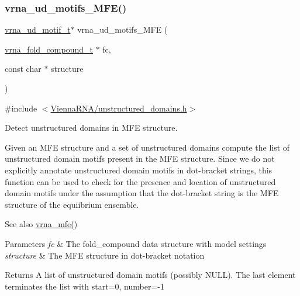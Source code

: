 \subsubsection{\texorpdfstring{vrna\_ud\_motifs\_MFE()}{vrna\_ud\_motifs\_MFE()}}
{\footnotesize\ttfamily \mbox{\hyperlink{structvrna__unstructured__domain__motif__s}{vrna\+\_\+ud\+\_\+motif\+\_\+t}}$\ast$ vrna\+\_\+ud\+\_\+motifs\+\_\+\+M\+FE (\begin{DoxyParamCaption}\item[{\mbox{\hyperlink{group__fold__compound_ga1b0cef17fd40466cef5968eaeeff6166}{vrna\+\_\+fold\+\_\+compound\+\_\+t}} $\ast$}]{fc,  }\item[{const char $\ast$}]{structure }\end{DoxyParamCaption})}



{\ttfamily \#include $<$\mbox{\hyperlink{unstructured__domains_8h}{Vienna\+R\+N\+A/unstructured\+\_\+domains.\+h}}$>$}



Detect unstructured domains in M\+FE structure. 

Given an M\+FE structure and a set of unstructured domains compute the list of unstructured domain motifs present in the M\+FE structure. Since we do not explicitly annotate unstructured domain motifs in dot-\/bracket strings, this function can be used to check for the presence and location of unstructured domain motifs under the assumption that the dot-\/bracket string is the M\+FE structure of the equiibrium ensemble.

\begin{DoxySeeAlso}{See also}
\mbox{\hyperlink{group__mfe__global_gabd3b147371ccf25c577f88bbbaf159fd}{vrna\+\_\+mfe()}}
\end{DoxySeeAlso}

\begin{DoxyParams}{Parameters}
{\em fc} & The fold\+\_\+compound data structure with model settings \\
\hline
{\em structure} & The M\+FE structure in dot-\/bracket notation \\
\hline
\end{DoxyParams}
\begin{DoxyReturn}{Returns}
A list of unstructured domain motifs (possibly N\+U\+LL). The last element terminates the list with {\ttfamily start=0}, {\ttfamily number=-\/1} 
\end{DoxyReturn}
\mbox{\label{group__domains__up_ga55f7de5ef5b7472b0eeab9296b57f671}} 
